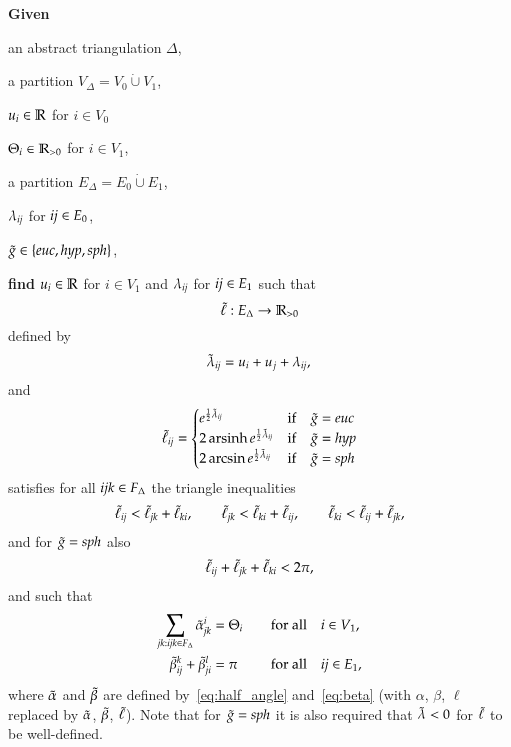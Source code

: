 \documentclass[Thesis]{subfiles}
\begin{document}
\begin{problem}
  \label{prob:analytic}
  \textbf{Given}
  \begin{compactitem}[$\bullet$]
  \item an abstract triangulation $\Delta$,
  \item a partition $V_{\Delta}=V_0\dot\cup V_1$,
  \item $u_{i}\in\mathbb R$ for $i\in{V_{0}}$
  \item $\Theta_{i}\in\mathbb R_{>0}$ for $i\in{V_{1}}$,
  \item a partition $E_{\Delta}=E_{0}\dot\cup E_{1}$,
  \item $\lambda_{\it ij}$ for ${\it ij}\in{E_{0}}$,
  \item $\gt\in\{\euc, \hyp, \sph\}$,
  \end{compactitem}
  \textbf{find} $u_{i}\in\mathbb R$ for $i\in{V_{1}}$ and $\lambda_{\it ij}$
  for ${\it ij}\in{E_{1}}$
  such that 
  \begin{equation*}
    \tilde{\ell}:E_{\Delta}\rightarrow\mathbb R_{>0}
  \end{equation*}
  defined by
  \begin{equation}
    \label{eq:lambdat}
    \tilde{\lambda}_{\it ij} = u_{i} + u_{j} + \lambda_{\it ij},\\
  \end{equation}
  and
  \begin{equation}
    \label{eq:ellt}
    \ellt_{\it ij} =
    \begin{cases}
      e^{\frac{1}{2}\lambdat_{\it ij}} & \text{if}\quad \gt=\euc\\
      2\arsinh e^{\frac{1}{2}\lambdat_{\it ij}} & \text{if}\quad \gt=\hyp\\
      2\arcsin e^{\frac{1}{2}\lambdat_{\it ij}} & \text{if}\quad \gt=\sph\\
    \end{cases}    
  \end{equation}
  satisfies for all ${\it ijk}\in F_{\Delta}$ the triangle inequalities
  \begin{equation}
    \label{eq:triang_ineq}
    \tilde{\ell}_{\it ij}<\tilde{\ell}_{\it jk}+\tilde{\ell}_{\it ki},\qquad
    \tilde{\ell}_{\it jk}<\tilde{\ell}_{\it ki}+\tilde{\ell}_{\it ij},\qquad
    \tilde{\ell}_{\it ki}<\tilde{\ell}_{\it ij}+\tilde{\ell}_{\it jk},
  \end{equation}
  and for
  $\tilde{g}=\mathit{sph}$ also
  \begin{equation}
    \label{eq:triang_ineq_sph}
    \tilde{\ell}_{\it ij}+\tilde{\ell}_{\it jk}+\tilde{\ell}_{\it ki}<2\pi,
  \end{equation}
   and such that
    \begin{alignat}{2}
    \label{eq:vertex_system}
    \sum_{{\it jk}:{\it ijk}\in F_{\Delta}}\tilde{\alpha}_{\it jk}^i &= \Theta_i&
    \quad&\text{for all}\quad i\in V_{1},\\
    \label{eq:edge_system}
    \tilde{\beta}_{\it ij}^k+\tilde{\beta}_{\it ji}^l &= \pi& 
    \quad&\text{for all}\quad
    \textit{ij} \in E_{1},
  \end{alignat}
  where $\tilde{\alpha}$ and $\tilde{\beta}$ are defined by~\eqref{eq:half_angle}
  and~\eqref{eq:beta} (with $\alpha$, $\beta$, $\ell$ replaced by
  $\tilde{\alpha}$, $\tilde{\beta}$, $\tilde{\ell}$). Note that for $\tilde{g}=\mathit{sph}$ it is also required
  that $\tilde{\lambda}<0$ for $\tilde{\ell}$ to be well-defined.
\end{problem}
\end{document}
